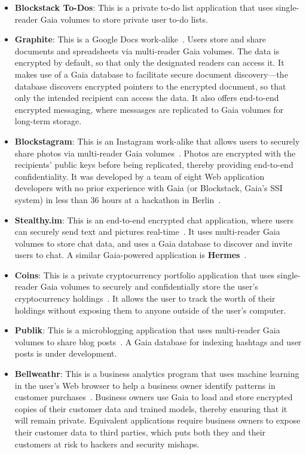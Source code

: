 \begin{itemize}
   \item \textbf{Blockstack To-Dos}:  This is a private to-do list application
      that uses single-reader Gaia volumes to store private user to-do lists.
   \item \textbf{Graphite}:  This is a Google Docs work-alike~\cite{graphite-docs}.  Users store and share documents and
      spreadsheets via multi-reader Gaia volumes.  The data is encrypted by
      default, so that only the designated readers can access it.  It makes use
      of a Gaia database to facilitate secure document discovery---the database
      discovers encrypted pointers to the encrypted document, so that only the
      intended recipient can access the data.  It also offers end-to-end
      encrypted messaging, where messasges are replicated to Gaia volumes for
      long-term storage.
  \item \textbf{Blockstagram}:  This is an Instagram work-alike that allows
     users to securely share photos via multi-reader Gaia
      volumes~\cite{blockstagram}.  Photos are
     encrypted with the recipients' public keys before being replicated, thereby
      providing end-to-end confidentiality.  It was developed by a team of eight
      Web application developers with no prior experience with Gaia (or
      Blockstack, Gaia's SSI system) in less than 36 hours at a hackathon in
      Berlin~\cite{patrick-tweet-blockstagram}.  %
  \item \textbf{Stealthy.im}:  This is an end-to-end encrypted chat application,
     where users can securely send text and pictures
      real-time~\cite{stealthy.im}.  It uses
      multi-reader Gaia volumes to store chat data, and uses a Gaia database to
      discover and invite users to chat.  A similar Gaia-powered application is
      \textbf{Hermes}~\cite{hi-hermes}.
  \item \textbf{Coins}:  This is a private cryptocurrency portfolio application
     that uses single-reader Gaia volumes to securely and confidentially store
      the user's cryptocurrency holdings~\cite{coins}.  It allows the user to track the worth
      of their holdings without exposing them to anyone outside of the user's
      computer.
  \item \textbf{Publik}:  This is a microblogging application that uses
     multi-reader Gaia volumes to share blog posts~\cite{publik}.  A Gaia
      database for indexing hashtags and user posts is under development.
  \item \textbf{Bellweathr}:  This is a business analytics program that uses
     machine learning in the user's Web browser to help a business owner
      identify patterns in customer purchases~\cite{bellweathr}.  Business
      owners use Gaia to load and store encrypted copies of their customer data
      and trained models, thereby ensuring that it will remain private.
      Equivalent applications require business owners to expose their customer
      data to third parties, which puts both they and their customers at risk 
      to hackers and security mishaps.
\end{itemize}

